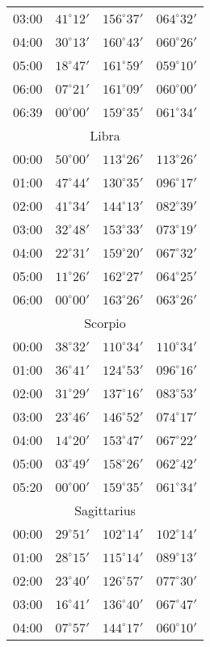 \begin{table}
\begin{Parallel}{}{}
{{\begin{tabular}{l|lll}
03:00 & $41^\circ 12'$ & $156^\circ 37'$& $064^\circ 32'$ \\
04:00 & $30^\circ 13'$ & $160^\circ 43'$& $060^\circ 26'$ \\
05:00 & $18^\circ 47'$ & $161^\circ 59'$& $059^\circ 10'$ \\
06:00 & $07^\circ 21'$ & $161^\circ 09'$& $060^\circ 00'$ \\
06:39 & $00^\circ 00'$ & $159^\circ 35'$& $061^\circ 34'$ \\
\multicolumn{4}{c}{Libra}\\
00:00 & $50^\circ 00'$ & $113^\circ 26'$& $113^\circ 26'$ \\
01:00 & $47^\circ 44'$ & $130^\circ 35'$& $096^\circ 17'$ \\
02:00 & $41^\circ 34'$ & $144^\circ 13'$& $082^\circ 39'$ \\
03:00 & $32^\circ 48'$ & $153^\circ 33'$& $073^\circ 19'$ \\
04:00 & $22^\circ 31'$ & $159^\circ 20'$& $067^\circ 32'$ \\
05:00 & $11^\circ 26'$ & $162^\circ 27'$& $064^\circ 25'$ \\
06:00 & $00^\circ 00'$ & $163^\circ 26'$& $063^\circ 26'$ \\
\multicolumn{4}{c}{Scorpio}\\
00:00 & $38^\circ 32'$ & $110^\circ 34'$& $110^\circ 34'$ \\
01:00 & $36^\circ 41'$ & $124^\circ 53'$& $096^\circ 16'$ \\
02:00 & $31^\circ 29'$ & $137^\circ 16'$& $083^\circ 53'$ \\
03:00 & $23^\circ 46'$ & $146^\circ 52'$& $074^\circ 17'$ \\
04:00 & $14^\circ 20'$ & $153^\circ 47'$& $067^\circ 22'$ \\
05:00 & $03^\circ 49'$ & $158^\circ 26'$& $062^\circ 42'$ \\
05:20 & $00^\circ 00'$ & $159^\circ 35'$& $061^\circ 34'$ \\
\multicolumn{4}{c}{Sagittarius}\\
00:00 & $29^\circ 51'$ & $102^\circ 14'$& $102^\circ 14'$ \\
01:00 & $28^\circ 15'$ & $115^\circ 14'$& $089^\circ 13'$ \\
02:00 & $23^\circ 40'$ & $126^\circ 57'$& $077^\circ 30'$ \\
03:00 & $16^\circ 41'$ & $136^\circ 40'$& $067^\circ 47'$ \\
04:00 & $07^\circ 57'$ & $144^\circ 17'$& $060^\circ 10'$ \\

\end{tabular}}}
\end{Parallel}
\end{table}
